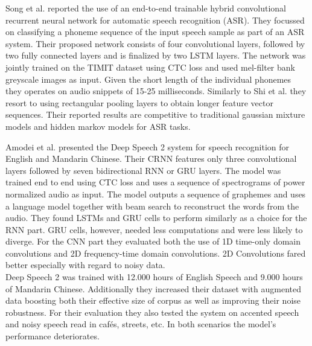 Song et al.\cite{song2015end} reported the use of an end-to-end trainable hybrid convolutional recurrent neural network for automatic speech recognition (ASR). They focussed on classifying a phoneme sequence of the input speech sample as part of an ASR system. Their proposed network consists of four convolutional layers, followed by two fully connected layers and is finalized by two LSTM layers. The network was jointly trained on the TIMIT dataset using CTC loss and used mel-filter bank greyscale images as input. Given the short length of the individual phonemes they operates on audio snippets of 15-25 milliseconds. Similarly to Shi et al.\cite{shi2016end} they resort to using rectangular pooling layers to obtain longer feature vector sequences. Their reported results are competitive to traditional gaussian mixture models and hidden markov models for ASR tasks. 

Amodei et al.\cite{amodei2015deep} presented the Deep Speech 2 system for speech recognition for English and Mandarin Chinese. Their CRNN features only three convolutional layers followed by seven bidirectional RNN or GRU layers. The model was trained end to end using CTC loss and uses a sequence of spectrograms of power normalized audio as input. The model outputs a sequence of graphemes and uses a language model together with beam search to reconstruct the words from the audio. They found LSTMs and GRU cells to perform similarly as a choice for the RNN part. GRU cells, however, needed less computations and were less likely to diverge. For the CNN part they evaluated both the use of 1D time-only domain convolutions and 2D frequency-time domain convolutions. 2D Convolutions fared better especially with regard to noisy data.\\ 
Deep Speech 2 was trained with 12.000 hours of English Speech and 9.000 hours of Mandarin Chinese. Additionally they increased their dataset with augmented data boosting both their effective size of corpus as well as improving their noise robustness. For their evaluation they also tested the system on accented speech and noisy speech read in cafés, streets, etc. In both scenarios the model's performance deteriorates.

